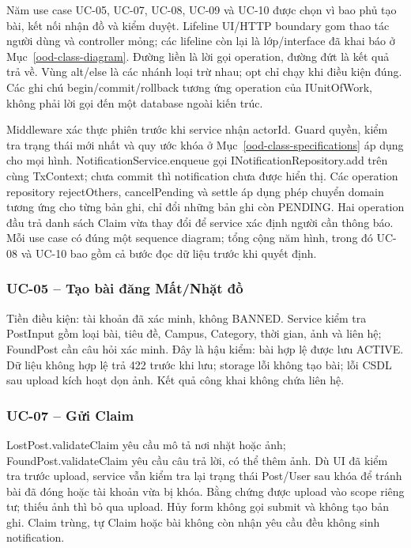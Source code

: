 Năm use case UC-05, UC-07, UC-08, UC-09 và UC-10 được chọn vì bao phủ tạo bài, kết nối nhận đồ và kiểm duyệt. Lifeline UI/HTTP boundary gom thao tác người dùng và controller mỏng; các lifeline còn lại là lớp/interface đã khai báo ở Mục~\ref{ood-class-diagram}. Đường liền là lời gọi operation, đường đứt là kết quả trả về. Vùng alt/else là các nhánh loại trừ nhau; opt chỉ chạy khi điều kiện đúng. Các ghi chú begin/commit/rollback tương ứng operation của IUnitOfWork, không phải lời gọi đến một database ngoài kiến trúc.

Middleware xác thực phiên trước khi service nhận actorId. Guard quyền, kiểm tra trạng thái mới nhất và quy ước khóa ở Mục~\ref{ood-class-specifications} áp dụng cho mọi hình. NotificationService.enqueue gọi INotificationRepository.add trên cùng TxContext; chưa commit thì notification chưa được hiển thị. Các operation repository rejectOthers, cancelPending và settle áp dụng phép chuyển domain tương ứng cho từng bản ghi, chỉ đổi những bản ghi còn PENDING. Hai operation đầu trả danh sách Claim vừa thay đổi để service xác định người cần thông báo. Mỗi use case có đúng một sequence diagram; tổng cộng năm hình, trong đó UC-08 và UC-10 bao gồm cả bước đọc dữ liệu trước khi quyết định.

\subsubsection{UC-05 -- Tạo bài đăng Mất/Nhặt đồ}
Tiền điều kiện: tài khoản đã xác minh, không BANNED. Service kiểm tra PostInput gồm loại bài, tiêu đề, Campus, Category, thời gian, ảnh và liên hệ; FoundPost cần câu hỏi xác minh. Đây là hậu kiểm: bài hợp lệ được lưu ACTIVE. Dữ liệu không hợp lệ trả 422 trước khi lưu; storage lỗi không tạo bài; lỗi CSDL sau upload kích hoạt dọn ảnh. Kết quả công khai không chứa liên hệ.


\subsubsection{UC-07 -- Gửi Claim}
LostPost.validateClaim yêu cầu mô tả nơi nhặt hoặc ảnh; FoundPost.validateClaim yêu cầu câu trả lời, có thể thêm ảnh. Dù UI đã kiểm tra trước upload, service vẫn kiểm tra lại trạng thái Post/User sau khóa để tránh bài đã đóng hoặc tài khoản vừa bị khóa. Bằng chứng được upload vào scope riêng tư; thiếu ảnh thì bỏ qua upload. Hủy form không gọi submit và không tạo bản ghi. Claim trùng, tự Claim hoặc bài không còn nhận yêu cầu đều không sinh notification.


